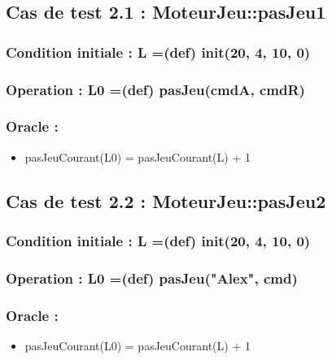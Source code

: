 \documentclass[11pt]{article}
\begin{document}
\subsection{Cas de test 2.1 : MoteurJeu::pasJeu1}
\label{sec-1.6}

\subsubsection{Condition initiale : L =(def) init(20, 4, 10, 0)}
\label{sec-1.6.1}

\subsubsection{Operation : L0 =(def) pasJeu(cmdA, cmdR)}
\label{sec-1.6.2}

\subsubsection{Oracle :}
\label{sec-1.6.3}

\begin{itemize}

\item pasJeuCourant(L0) = pasJeuCourant(L) + 1\\
\label{sec-1.6.3.1}


\end{itemize} %
\subsection{Cas de test 2.2 : MoteurJeu::pasJeu2}
\label{sec-1.7}

\subsubsection{Condition initiale : L =(def) init(20, 4, 10, 0)}
\label{sec-1.7.1}

\subsubsection{Operation : L0 =(def) pasJeu("Alex", cmd)}
\label{sec-1.7.2}

\subsubsection{Oracle :}
\label{sec-1.7.3}

\begin{itemize}

\item pasJeuCourant(L0) = pasJeuCourant(L) + 1\\
\label{sec-1.7.3.1}


\end{itemize} %
\end{document}
